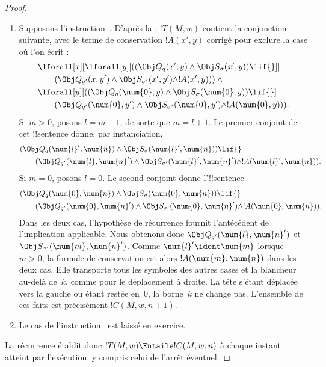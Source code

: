 \documentclass[../../../include/open-logic-section]{subfiles}
\begin{document}
\begin{proof}
\begin{enumerate}
\item Supposons l'instruction~. D'après
  la , $!T(M,w)$
  contient la conjonction suivante, avec le terme de conservation
  $!A(x',y)$ corrigé pour exclure la case où l'on écrit :
\begin{align*}
& \lforall[x][\lforall[y][(
  (\Obj Q_q(x',y)\land\Obj S_\sigma(x',y))\lif {}]]\\
&\qquad (\Obj Q_{q'}(x,y')\land
  \Obj S_{\sigma'}(x',y')\land !A(x',y)))\land {}\\
& \lforall[y][(
  (\Obj Q_q(\num{0},y)\land
  \Obj S_\sigma(\num{0},y))\lif {}]\\
&\qquad (\Obj Q_{q'}(\num{0},y')\land
  \Obj S_{\sigma'}(\num{0},y')\land
  !A(\num{0},y))).
\end{align*}
  Si $m>0$, posons $l=m-1$, de sorte que $m=l+1$.
  Le premier conjoint de cet !!{sentence} donne, par instanciation,
\begin{align*}
& (\Obj Q_q(\num{l}',\num{n})\land
  \Obj S_\sigma(\num{l}',\num{n}))\lif {}\\
&\qquad (\Obj Q_{q'}(\num{l},\num{n}')\land
  \Obj S_{\sigma'}(\num{l}',\num{n}')\land
  !A(\num{l}',\num{n})).
\end{align*}
  Si $m=0$, posons $l=0$. Le second conjoint donne l'!!{sentence}
\begin{align*}
& (\Obj Q_q(\num{0},\num{n})\land
  \Obj S_\sigma(\num{0},\num{n}))\lif {}\\
&\qquad (\Obj Q_{q'}(\num{0},\num{n}')\land
  \Obj S_{\sigma'}(\num{0},\num{n}')\land
  !A(\num{0},\num{n})).
\end{align*}
  Dans les deux cas, l'hypothèse de récurrence fournit
  l'antécédent de l'implication applicable. Nous obtenons donc
  $\Obj Q_{q'}(\num{l},\num{n}')$ et
  $\Obj S_{\sigma'}(\num{m},\num{n}')$.
  Comme $\num{l}'\ident\num{m}$ lorsque $m>0$, la formule
  de conservation est alors $!A(\num{m},\num{n})$ dans les deux
  cas. Elle transporte tous les symboles des autres cases et la
  blancheur au-delà de~$k$, comme pour le déplacement à droite.
  La tête s'étant déplacée vers la gauche ou étant restée en~$0$,
  la borne~$k$ ne change pas. L'ensemble de ces faits est
  précisément $!C(M,w,n+1)$.

\item Le cas de l'instruction~ est laissé en exercice.
\end{enumerate}
La récurrence établit donc
$!T(M,w)\Entails !C(M,w,n)$ à chaque instant atteint par
l'exécution, y compris celui de l'arrêt éventuel.
\end{proof}
\end{document}
